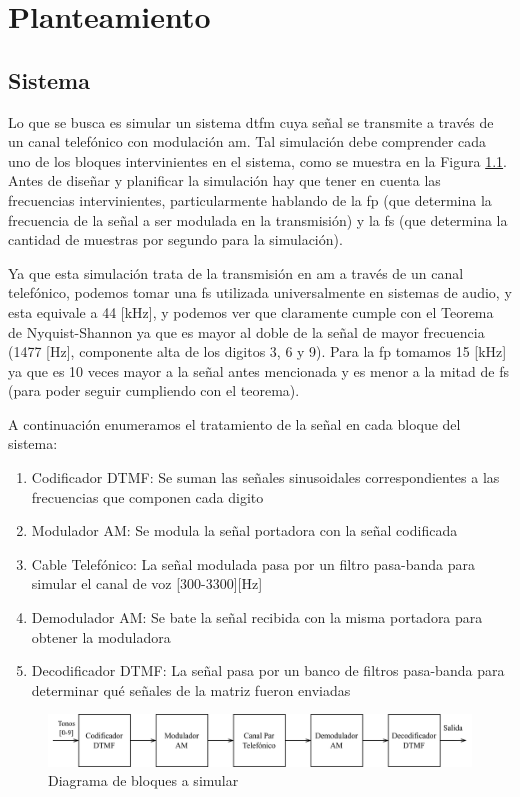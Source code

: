 \chapter{Planteamiento}
\section{Sistema}
Lo que se busca es simular un sistema \gls{dtfm} cuya señal se transmite a través de un canal telefónico con modulación \gls{am}. Tal simulación debe comprender cada uno de los bloques intervinientes en el sistema, como se muestra en la Figura \ref{fig:diagrama_bloques_objetivo}. Antes de diseñar y planificar la simulación hay que tener en cuenta las frecuencias intervinientes, particularmente hablando de la \gls{fp} (que determina la frecuencia de la señal a ser modulada en la transmisión) y la \gls{fs} (que determina la cantidad de muestras por segundo para la simulación).

Ya que esta simulación trata de la transmisión en \gls{am} a través de un canal telefónico, podemos tomar una \gls{fs} utilizada universalmente en sistemas de audio, y esta equivale a 44 [kHz], y podemos ver que claramente cumple con el Teorema de Nyquist-Shannon ya que es mayor al doble de la señal de mayor frecuencia (1477 [Hz], componente alta de los digitos 3, 6 y 9). Para la \gls{fp} tomamos 15 [kHz] ya que es 10 veces mayor a la señal antes mencionada y es menor a la mitad de \gls{fs} (para poder seguir cumpliendo con el teorema).

A continuación enumeramos el tratamiento de la señal en cada bloque del sistema:

\begin{enumerate}
  \item Codificador DTMF: Se suman las señales sinusoidales correspondientes a las frecuencias que componen cada digito
  \item Modulador AM: Se modula la señal portadora con la señal codificada
  \item Cable Telefónico: La señal modulada pasa por un filtro pasa-banda para simular el canal de voz [300-3300][Hz]
  \item Demodulador AM: Se bate la señal recibida con la misma portadora para obtener la moduladora
  \item Decodificador DTMF: La señal pasa por un banco de filtros pasa-banda para determinar qué señales de la matriz fueron enviadas
\end{enumerate}

\begin{figure}[H]
  \centering
  \includegraphics[width=\linewidth]{images/planteamiento/bloques.png}
  \caption{Diagrama de bloques a simular}
  \label{fig:diagrama_bloques_objetivo}
\end{figure}

